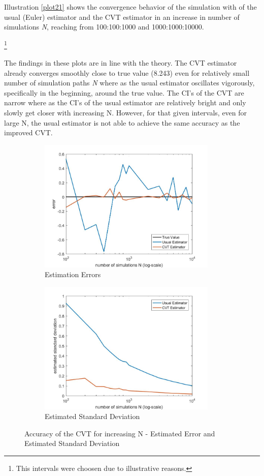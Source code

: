 \documentclass[a4paper,11pt]{article}
\begin{document}
Illustration \ref{plot21} shows the convergence behavior of the simulation with of the usual (Euler) estimator and the CVT estimator in an increase in number of simulations \textit{N}, reaching from 100:100:1000 and 1000:1000:10000.{\footnote{This intervals were choosen due to illustrative reasons.}

The findings in these plots are in line with the theory. The CVT estimator already converges smoothly close to true value (8.243) even for relatively small number of simulation paths \textit{N} where as the usual estimator oscillates vigorously, specifically in the beginning, around the true value. The CI's of the CVT are narrow where as the CI's of the usual estimator are relatively bright and only slowly get closer with increasing N. However, for that given intervals, even for large N, the usual estimator is not able to achieve the same accuracy as the improved CVT.

\begin{figure}[!h]
\centering
\begin{subfigure}[c]{0.5\textwidth}
\caption*{Estimation Errors}
\includegraphics[width=8.5cm]{plot23.jpeg}
\end{subfigure}
\begin{subfigure}[c]{0.4\textwidth}
\caption*{Estimated Standard Deviation}
\includegraphics[width=8.5cm]{plot22.jpeg}
\end{subfigure}
\caption{Accuracy of the CVT for increasing N - Estimated Error and  Estimated Standard Deviation}
\label{plot22}
\end{figure}

}
\end{document}
